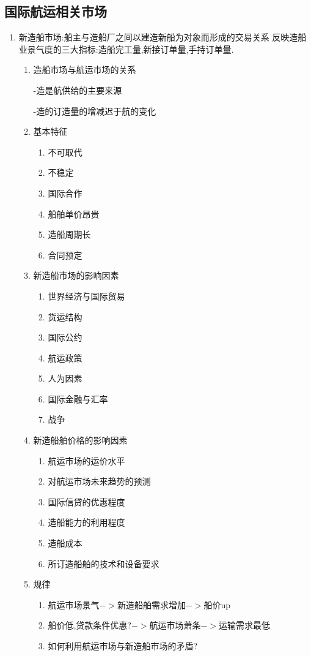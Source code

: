 \documentclass[UTF8,a4paper]{ctexart}
\begin{document}
	\subsection{国际航运相关市场}
		\begin{enumerate}[1)]
			\item 新造船市场:船主与造船厂之间以建造新船为对象而形成的交易关系
			反映造船业景气度的三大指标:造船完工量,新接订单量,手持订单量.
				\begin{enumerate}[.]
					\item 造船市场与航运市场的关系
						
						-造是航供给的主要来源
						
						-造的订造量的增减迟于航的变化
						
					\item 基本特征
						\begin{enumerate}[-]
							\item 不可取代
							\item 不稳定
							\item 国际合作
							\item 船舶单价昂贵
							\item 造船周期长
							\item 合同预定
						\end{enumerate}
					\item 新造船市场的影响因素
						\begin{enumerate}[-]
							\item 世界经济与国际贸易
							\item 货运结构
							\item 国际公约
							\item 航运政策
							\item 人为因素
							\item 国际金融与汇率
							\item 战争
						\end{enumerate}
					\item 新造船舶价格的影响因素
						\begin{enumerate}[-]
							\item 航运市场的运价水平
							\item 对航运市场未来趋势的预测
							\item 国际信贷的优惠程度
							\item 造船能力的利用程度
							\item 造船成本
							\item 所订造船舶的技术和设备要求
						\end{enumerate}
					\item 规律
						\begin{enumerate}[-]
							\item 航运市场景气$->$新造船舶需求增加$->$船价up
							\item 船价低,贷款条件优惠?$->$航运市场萧条$->$运输需求最低
							\item 如何利用航运市场与新造船市场的矛盾?
						\end{enumerate}
				\end{enumerate}


\end{enumerate}
\end{document}
